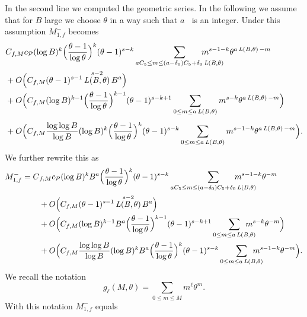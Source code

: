 \documentclass[JEP,XML,SOM,Unicode,published]{cedram}
\DeclareMathOperator{\LBt}{\mathit{L(B,\theta)}}
\let\del\delta
\let\tet\theta
\newcommand{\calP}{\mathcal{P}}
\theoremstyle{definition}
\numberwithin{theorem}{section}
\begin{document}
In the second line we computed the geometric series.
In the following we assume that for $B$ large we choose $\tet$ in a way such that $a \LBt$ is an integer.
Under this assumption $M_{1,f}^-$ becomes\vspace*{-3pt}
\begin{equation*}
\begin{split}
&C_{f,M}c_{\calP} (\log B)^k \Bigl(\frac{\tet -1}{\log \tet}\Bigr)^k (\tet-1)^{s-k} \sum_{aC_5\leq m\leq (a-\del_0) C_5 + \del_0 \LBt}\hspace*{-10mm} m^{s-1-k}\tet^{a\LBt -m} \\
&+O\Bigl(C_{f,M} (\tet -1)^{s-1} \LBt^{s-2} B^{a} \Bigr)\\
&+O\Bigl(C_{f,M} (\log B)^{k-1} \Bigl(\frac{\tet -1}{\log \tet}\Bigr)^{k-1}(\tet-1)^{s-k+1} \sum_{0\leq m\leq a \LBt} m^{s-k} \tet^{a \LBt -m} \Bigr)\\[-12pt]
\\ &+O\Bigl(C_{f,M}\frac{\log \log B}{\log B} (\log B)^k \Bigl(\frac{\tet -1}{\log \tet}\Bigr)^k (\tet-1)^{s-k} \sum_{0\leq m\leq a \LBt} m^{s-1-k}\tet^{a \LBt -m} \Bigr).
\end{split}
\end{equation*}
We further rewrite this as\vspace*{-3pt}
\begin{equation*}
\begin{split}
M_{1,f}^-= C&_{f,M}c_{\calP} (\log B)^kB^{a} \Bigl(\frac{\tet -1}{\log \tet}\Bigr)^k (\tet-1)^{s-k} \sum_{a C_5\leq m\leq (a-\del_0) C_5 + \del_0 \LBt}\hspace*{-10mm} m^{s-1-k}\tet^{-m} \\
&+O\Bigl(C_{f,M} (\tet -1)^{s-1} \LBt^{s-2} B^{a} \Bigr)\\
&+O\Bigl(C_{f,M} (\log B)^{k-1} B^{a} \Bigl(\frac{\tet -1}{\log \tet}\Bigr)^{k-1}(\tet-1)^{s-k+1} \sum_{0\leq m\leq a \LBt} \hspace*{-5mm}m^{s-k} \tet^{-m} \Bigr)\\
&+O\Bigl(C_{f,M}\frac{\log \log B}{\log B} (\log B)^kB^{a} \Bigl(\frac{\tet -1}{\log \tet}\Bigr)^k (\tet-1)^{s-k} \sum_{0\leq m\leq a \LBt}\hspace*{-5mm} m^{s-1-k}\tet^{-m} \Bigr).
\end{split}
\end{equation*}
We recall the notation
\[
g_\ell(M,\tet)=\sum_{0\leq m\leq M} m^\ell \tet^m.
\]
With this notation $M_{1,f}^- $ equals
\end{document}
